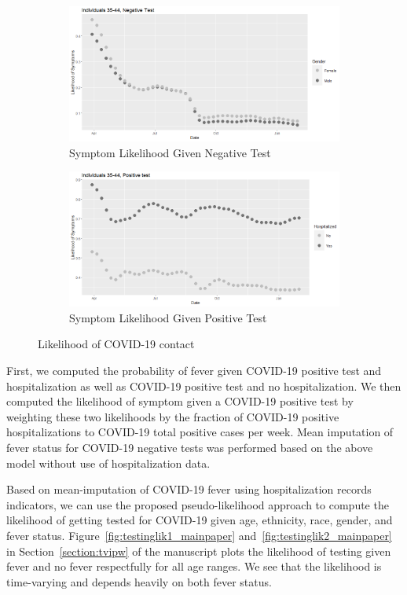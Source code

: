 \documentclass[12pt]{amsart}
\numberwithin{equation}{section}
\theoremstyle{plain}
\begin{document}
\begin{figure}[!th]
\centering
\begin{subfigure}{.5\textwidth}
 \centering
 \includegraphics[width=.9\linewidth]{../figs/tvprop_symptom_alt_fig1.png}
 \caption{Symptom Likelihood Given Negative Test}
 \label{fig:symptomlik1_model2}
\end{subfigure}%
\begin{subfigure}{.5\textwidth}
 \centering
\includegraphics[width=.9\linewidth]{../figs/tvprop_symptom_alt_fig2.png}
 \caption{Symptom Likelihood Given Positive Test}
 \label{fig:symptomlik2_model2}
\end{subfigure}
\caption{Likelihood of COVID-19 contact}
\label{fig:symptomlik_model2}
\end{figure}

First, we computed the probability of fever given COVID-19 positive test and hospitalization as well as COVID-19 positive test and no hospitalization.  We then computed the likelihood of symptom given a COVID-19 positive test by weighting these two likelihoods by the fraction of COVID-19 positive hospitalizations to COVID-19 total positive cases per week.  Mean imputation of fever status for COVID-19 negative tests was performed based on the above model without use of hospitalization data.

Based on mean-imputation of COVID-19 fever using hospitalization records indicators, we can use the proposed pseudo-likelihood approach to compute the likelihood of getting tested for COVID-19 given age, ethnicity, race, gender, and fever status.  Figure~\ref{fig:testinglik1_mainpaper} and~\ref{fig:testinglik2_mainpaper} in Section~\ref{section:tvipw} of the manuscript plots the likelihood of testing given fever and no fever respectfully for all age ranges.  We see that the likelihood is time-varying and depends heavily on both fever status.
\end{document}
